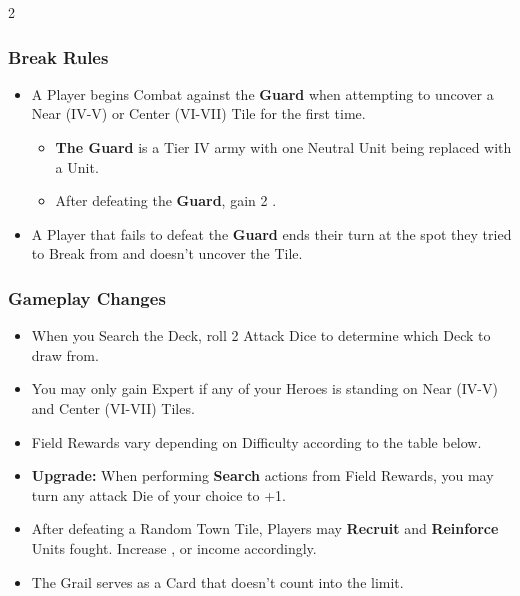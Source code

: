 \begin{multicols}{2}
\subsubsection*{Break Rules}
\begin{itemize}
  \item A Player begins Combat against the \textbf{Guard} when attempting to uncover a Near (IV-V) or Center (VI-VII) Tile for the first time.
  \begin{itemize}
    \item \textbf{The Guard} is a Tier IV army with one Neutral  Unit being replaced with a  Unit.
    \item After defeating the \textbf{Guard}, gain 2 .
  \end{itemize}
  \item A Player that fails to defeat the \textbf{Guard} ends their turn at the spot they tried to Break from and doesn't uncover the Tile.
\end{itemize}

\subsubsection*{Gameplay Changes}

\begin{itemize}
  \item When you Search the  Deck, roll 2 Attack Dice to determine which  Deck to draw from.
  \item You may only gain Expert  if any of your Heroes is standing on Near (IV-V) and Center (VI-VII) Tiles.
  \item Field Rewards vary depending on Difficulty according to the table below.
  \item \textbf{Upgrade:} When performing \textbf{Search} actions from Field Rewards, you may turn any attack Die of your choice to +1.
  \item After defeating a Random Town Tile, Players may \textbf{Recruit} and \textbf{Reinforce} Units fought. Increase ,  or  income accordingly.
  \item The Grail serves as a  Card that doesn't count into the limit.
\end{itemize}

\end{multicols}


